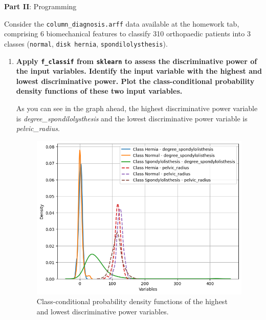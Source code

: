 \documentclass[12pt]{article}
\begin{document}
\vskip 0.5cm

\begin{center}
\large{\textbf{Part II}: Programming}\normalsize
\end{center}

\noindent Consider the \texttt{column\_diagnosis.arff} data available at the homework tab, comprising 6 biomechanical
features to classify 310 orthopaedic patients into 3 classes (\texttt{normal}, \texttt{disk hernia}, \texttt{spondilolysthesis}).

\begin{enumerate}[leftmargin=\labelsep]
    \item \textbf{Apply \texttt{f\_classif} from \texttt{sklearn} to assess the discriminative power of the input variables.
          Identify the input variable with the highest and lowest discriminative power.
          Plot the class-conditional probability density functions of these two input variables.}

          \vskip 0.3cm
          

          As you can see in the graph ahead, the highest discriminative power variable is \textit{degree\_spondilolysthesis} and
          the lowest discriminative power variable is \textit{pelvic\_radius}.

          \vskip -0.57cm

          \begin{figure}[H]
              \centering
              \includegraphics[width=14cm]{./assets/class_conditional_probability.png}
              \caption{Class-conditional probability density functions of the highest and lowest discriminative power variables.}
              \label{fig:PartII-ex1-plot}
          \end{figure}


\end{enumerate}
\end{document}
